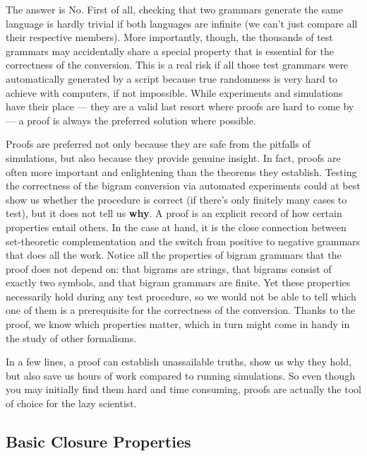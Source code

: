 The answer is No.
First of all, checking that two grammars generate the same language is hardly trivial if both languages are infinite (we can't just compare all their respective members).
More importantly, though, the thousands of test grammars may accidentally share a special property that is essential for the correctness of the conversion.
This is a real risk if all those test grammars were automatically generated by a script because true randomness is very hard to achieve with computers, if not impossible.
While experiments and simulations have their place --- they are a valid last resort where proofs are hard to come by --- a proof is always the preferred solution where possible.

Proofs are preferred not only because they are safe from the pitfalls of simulations, but also because they provide genuine insight.
In fact, proofs are often more important and enlightening than the theorems they establish.
Testing the correctness of the bigram conversion via automated experiments could at best show us whether the procedure is correct (if there's only finitely many cases to test), but it does not tell us \textbf{why}.
A proof is an explicit record of how certain properties entail others.
In the case at hand, it is the close connection between set-theoretic complementation and the switch from positive to negative grammars that does all the work.
Notice all the properties of bigram grammars that the proof does not depend on: that bigrams are strings, that bigrams consist of exactly two symbols, and that bigram grammars are finite. 
Yet these properties necessarily hold during any test procedure, so we would not be able to tell which one of them is a prerequisite for the correctness of the conversion.
Thanks to the proof, we know which properties matter, which in turn might come in handy in the study of other formalisms.

In a few lines, a proof can establish unassailable truths, show us why they hold, but also save us hours of work compared to running simulations.
So even though you may initially find them hard and time consuming, proofs are actually the tool of choice for the lazy scientist.


\subsection{Basic Closure Properties}


